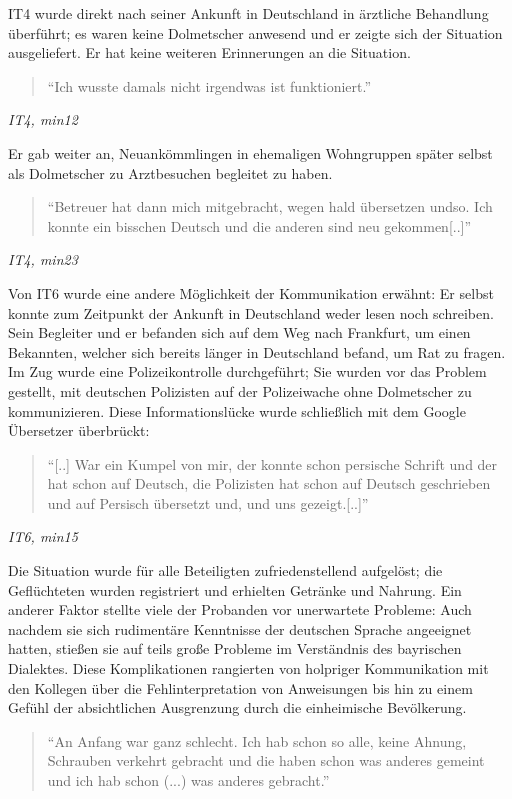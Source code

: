 IT4 wurde direkt nach seiner Ankunft in Deutschland in ärztliche Behandlung überführt; es waren keine Dolmetscher anwesend und er zeigte sich der Situation ausgeliefert. Er hat keine weiteren Erinnerungen an die Situation.
\begin{quote}
    ``Ich wusste damals nicht irgendwas ist funktioniert.''
\end{quote}
\centerline{\textit{IT4, min12}}
Er gab weiter an, Neuankömmlingen in ehemaligen Wohngruppen später selbst als Dolmetscher zu Arztbesuchen begleitet zu haben.
\begin{quote}
    ``Betreuer hat dann mich mitgebracht, wegen hald übersetzen undso. Ich konnte ein bisschen Deutsch und die anderen sind neu gekommen[..]''
\end{quote}
\centerline{\textit{IT4, min23}}
Von IT6 wurde eine andere Möglichkeit der Kommunikation erwähnt:\newline
Er selbst konnte zum Zeitpunkt der Ankunft in Deutschland weder lesen noch schreiben. Sein Begleiter und er befanden sich auf dem Weg nach Frankfurt, um einen Bekannten, welcher sich bereits länger in Deutschland befand, um Rat zu fragen. Im Zug wurde eine Polizeikontrolle durchgeführt; Sie wurden vor das Problem gestellt, mit deutschen Polizisten auf der Polizeiwache ohne Dolmetscher zu kommunizieren. Diese Informationslücke wurde schließlich mit dem Google Übersetzer überbrückt:
\begin{quote}
    ``[..] War ein Kumpel von mir, der konnte schon persische Schrift und der hat schon auf Deutsch, die Polizisten hat schon auf Deutsch geschrieben und auf Persisch übersetzt und, und uns gezeigt.[..]''
\end{quote}
\centerline{\textit{IT6, min15}}
Die Situation wurde für alle Beteiligten zufriedenstellend aufgelöst; die Geflüchteten wurden registriert und erhielten Getränke und Nahrung.
Ein anderer Faktor stellte viele der Probanden vor unerwartete Probleme:\newline
Auch nachdem sie sich rudimentäre Kenntnisse der deutschen Sprache angeeignet hatten, stießen sie auf teils große Probleme im Verständnis des bayrischen Dialektes. Diese Komplikationen rangierten von holpriger Kommunikation mit den Kollegen über die Fehlinterpretation von Anweisungen bis hin zu einem Gefühl der absichtlichen Ausgrenzung durch die einheimische Bevölkerung. \newline
\begin{quote}
    ``An Anfang war ganz schlecht. Ich hab schon so alle, keine Ahnung, Schrauben verkehrt gebracht und die haben schon was anderes gemeint und ich hab schon (...) was anderes gebracht.''
\end{quote}
